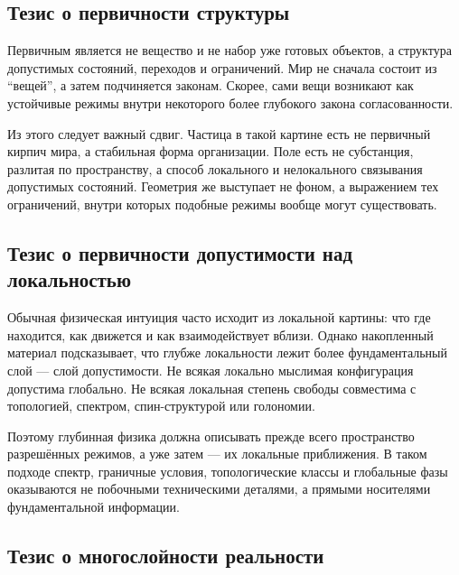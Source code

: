 \documentclass[12pt,a4paper]{article}
\begin{document}
\subsection{Тезис о первичности структуры}

Первичным является не вещество и не набор уже готовых объектов, а структура допустимых состояний, переходов и ограничений. Мир не сначала состоит из ``вещей'', а затем подчиняется законам. Скорее, сами вещи возникают как устойчивые режимы внутри некоторого более глубокого закона согласованности.

Из этого следует важный сдвиг. Частица в такой картине есть не первичный кирпич мира, а стабильная форма организации. Поле есть не субстанция, разлитая по пространству, а способ локального и нелокального связывания допустимых состояний. Геометрия же выступает не фоном, а выражением тех ограничений, внутри которых подобные режимы вообще могут существовать.

\subsection{Тезис о первичности допустимости над локальностью}

Обычная физическая интуиция часто исходит из локальной картины: что где находится, как движется и как взаимодействует вблизи. Однако накопленный материал подсказывает, что глубже локальности лежит более фундаментальный слой --- слой допустимости. Не всякая локально мыслимая конфигурация допустима глобально. Не всякая локальная степень свободы совместима с топологией, спектром, спин-структурой или голономии.

Поэтому глубинная физика должна описывать прежде всего пространство разрешённых режимов, а уже затем --- их локальные приближения. В таком подходе спектр, граничные условия, топологические классы и глобальные фазы оказываются не побочными техническими деталями, а прямыми носителями фундаментальной информации.

\subsection{Тезис о многослойности реальности}
\end{document}
